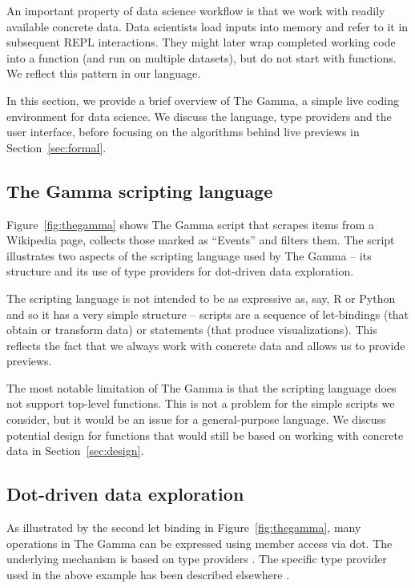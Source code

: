 \documentclass[sigplan,10pt]{acmart}\settopmatter{printfolios=true,printccs=false,printacmref=false}
\theoremstyle{plain}
\theoremstyle{definition}
\begin{document}
An important property of data science workflow is that we work with readily available concrete data.
Data scientists load inputs into memory and refer to it in subsequent REPL interactions. They might 
later wrap completed working code into a function (and run on multiple datasets), but 
do not start with functions. We reflect this pattern in our language. 

In this section, we provide a brief overview of The Gamma, a simple live coding environment for
data science. We discuss the language, type providers and the user interface,
before focusing on the algorithms behind live previews in Section~\ref{sec:formal}.

\subsection{The Gamma scripting language}
Figure~\ref{fig:thegamma} shows The Gamma script that scrapes items from a Wikipedia page, 
collects those marked as ``Events'' and filters them. The script illustrates two aspects of the
scripting language used by The Gamma -- its structure and its use of type providers for
dot-driven data exploration.

The scripting language is not intended to be as expressive as, say, R or Python and so it
has a very simple structure -- scripts are a sequence of let-bindings (that obtain or transform 
data) or statements (that produce visualizations). This reflects the fact that we always work
with concrete data and allows us to provide previews.

The most notable limitation of The Gamma is that the scripting language does not support top-level 
functions. This is not a problem for the simple scripts we consider, but it would be an issue for
a general-purpose language. We discuss potential design for functions that would still be based
on working with concrete data in Section~\ref{sec:design}.

\subsection{Dot-driven data exploration}

As illustrated by the second let binding in Figure~\ref{fig:thegamma}, many operations
in The Gamma can be expressed using member access via dot. The underlying mechanism is based
on type providers \cite{providers-fsharp,providers-idris}. The specific type provider used in 
the above example has been described elsewhere \cite{gamma}.
\end{document}
